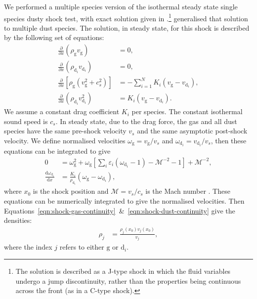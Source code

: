 \documentclass[fleqn,usenatbib]{mnras}
\newcommand{\g}{\mathrm{g}}
\newcommand{\dd}{\mathrm{d}}
\begin{document}
We performed a multiple species version of the isothermal steady state single
species dusty shock test, with exact solution given in
\citet{Lehmann2018MNRAS.476.3185L}.\footnote{The solution is described as a
J-type shock in which the fluid variables undergo a jump discontinuity, rather
than the properties being continuous across the front (as in a C-type shock).}
\citet{Benitez-Llambay2019ApJS..241...25B} generalised that solution to multiple
dust species. The solution, in steady state, for this shock is described by the
following set of equations:
%
\begin{align}
   \frac{\partial}{\partial x} \left( \rho_{\g} v_{\g} \right)
      &= 0, \label{eqn:shock-gas-continuity} \\
   \frac{\partial}{\partial x} \left( \rho_{\dd_i} v_{\dd_i} \right)
      &= 0, \label{eqn:shock-dust-continuity} \\
   \frac{\partial}{\partial x} \left[ \rho_{\g} (v_{\g}^2 + c_s^2)\right]
      &= - \sum_{i=1}^N K_i (v_{\g} - v_{\dd_i}), \\
   \frac{\partial}{\partial x} \left( \rho_{\dd_i} v_{\dd_i}^2 \right)
      &= K_i (v_{\g} - v_{\dd_i}).
\end{align}
%
We assume a constant drag coefficient \(K_i\) per species. The constant
isothermal sound speed is \(c_s\). In steady state, due to the drag force, the
gas and all dust species have the same pre-shock velocity \(v_s\) and the same
asymptotic post-shock velocity. We define normalised velocities \(\omega_{\g} =
v_{\g} / v_s\) and \(\omega_{\dd_i} = v_{\dd_i} / v_s\), then these equations
can be integrated to give
%
\begin{align}
   0 &= \omega_{\g}^2 + \omega_{\g} \left[ \sum_i \varepsilon_i (\omega_{\dd_i} - 1)
      - \mathcal{M}^{-2} -1 \right] + \mathcal{M}^{-2}, \\
   \frac{\dd \omega_{\dd_i}}{\dd x} &= \frac{K_i}{\rho_{\dd_i}}
      \left( \omega_{\g} - \omega_{\dd_i} \right),
\end{align}
%
where \(x_0\) is the shock position and \(\mathcal{M} = v_s / c_s\) is the Mach
number \citep{Benitez-Llambay2019ApJS..241...25B}. These equations can be
numerically integrated to give the normalised velocities. Then
Equations~\ref{eqn:shock-gas-continuity}~\&~\ref{eqn:shock-dust-continuity} give
the densities:
%
\begin{align}
   \rho_j &= \frac{\rho_j(x_0) v_j(x_0)}{v_j},
\end{align}
%
where the index \(j\) refers to either \(\g\) or \(\dd_i\).
\end{document}
